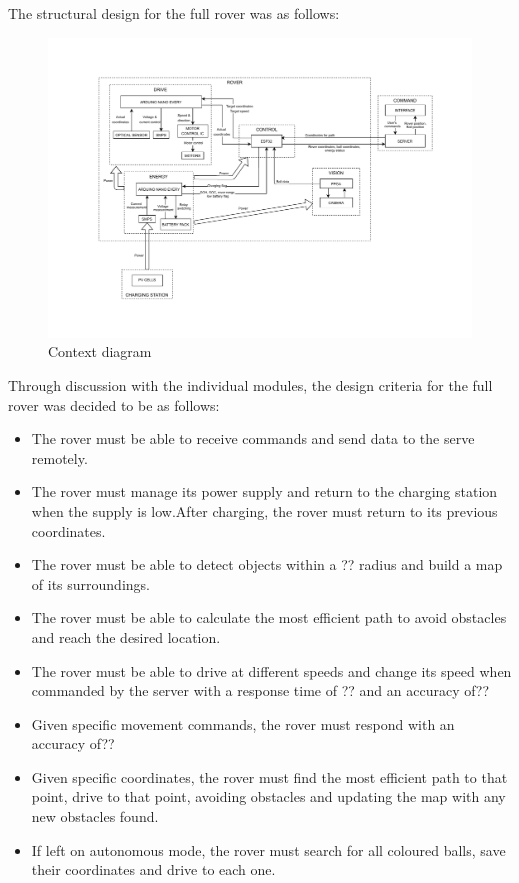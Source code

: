 \documentclass[10pt,twoside]{article}
\begin{document}
The structural design for the full rover was as follows:

\begin{figure}[hbt]
    \centering
    \includegraphics[scale = 0.5, trim={3cm 2cm 2cm 2cm},clip]{StructuralDiagram (1).pdf}
    \caption{Context diagram}
\end{figure}



Through discussion with the individual modules, the design criteria for the full rover was decided to be as follows:
\begin{itemize}
    \item The rover must be able to receive commands and send data to the serve remotely.
    \item The rover must manage its power supply and return to the charging station when the supply is low.After charging, the rover must return to its previous coordinates.
    \item The rover must be able to detect objects within a ?? radius and build a map of its surroundings.
    \item The rover must be able to calculate the most efficient path to avoid obstacles and reach the desired location.
    \item The rover must be able to drive at different speeds and change its speed when commanded by the server with a response time of ?? and an accuracy of??
    \item Given specific movement commands, the rover must respond with an accuracy of??
    \item Given specific coordinates, the rover must find the most efficient path to that point, drive to that point, avoiding obstacles and updating the map with any new obstacles found. 
    \item If left on autonomous mode, the rover must search for all coloured balls, save their coordinates and drive to each one.
\end{itemize}
\end{document}
